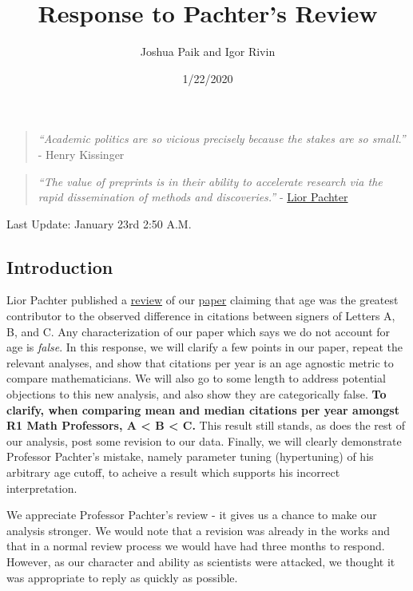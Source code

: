 \documentclass[]{article}
\title{Response to Pachter's Review}
\author{Joshua Paik and Igor Rivin}
\date{1/22/2020}
\begin{document}
\maketitle

{
\setcounter{tocdepth}{2}
\tableofcontents
}
\begin{quote}
\emph{``Academic politics are so vicious precisely because the stakes
are so small.''} - Henry Kissinger
\end{quote}

\begin{quote}
\emph{``The value of preprints is in their ability to accelerate
research via the rapid dissemination of methods and discoveries.''} -
\href{https://liorpachter.wordpress.com/2019/10/21/zero-data-rna-seq/}{Lior
Pachter}
\end{quote}

Last Update: January 23rd 2:50 A.M.

\hypertarget{introduction}{%
\subsection{Introduction}\label{introduction}}

Lior Pachter published a
\href{https://liorpachter.wordpress.com/2020/01/17/diversity-matters/}{review}
of our \href{https://arxiv.org/pdf/2001.00670.pdf}{paper} claiming that
age was the greatest contributor to the observed difference in citations
between signers of Letters A, B, and C. Any characterization of our
paper which says we do not account for age is \emph{false}. In this
response, we will clarify a few points in our paper, repeat the relevant
analyses, and show that citations per year is an age agnostic metric to
compare mathematicians. We will also go to some length to address
potential objections to this new analysis, and also show they are
categorically false. \textbf{To clarify, when comparing mean and median
citations per year amongst R1 Math Professors, A \textless{} B
\textless{} C.} This result still stands, as does the rest of our
analysis, post some revision to our data. Finally, we will clearly
demonstrate Professor Pachter's mistake, namely parameter tuning
(hypertuning) of his arbitrary age cutoff, to acheive a result which
supports his incorrect interpretation.

We appreciate Professor Pachter's review - it gives us a chance to make
our analysis stronger. We would note that a revision was already in the
works and that in a normal review process we would have had three months
to respond. However, as our character and ability as scientists were
attacked, we thought it was appropriate to reply as quickly as possible.
\end{document}
